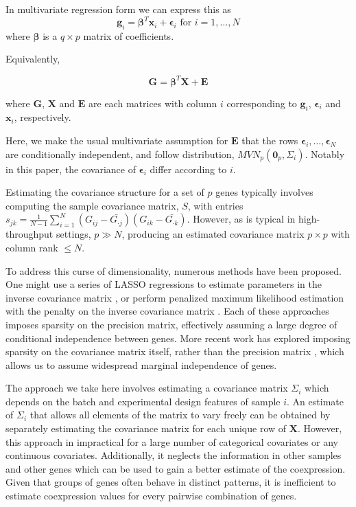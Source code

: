 In multivariate regression form we can express this as 
\[
\textbf{g}_{i}=\mathbf{\beta}^{T}\textbf{x}_{i}+\mathbf{\epsilon}_{i}\text{ for }i=1,\dots,N
\]
 where $\mathbf{\beta}$ is a $q\times p$ matrix of coefficients.

Equivalently,

\[
\textbf{G}=\mathbf{\beta}^T\textbf{X}+\mathbf{E}
\]

where $\textbf{G}$, $\textbf{X}$ and $\textbf{E}$ are each matrices
with column $i$ corresponding to $\textbf{g}_{i}$, $\mathbf{\epsilon}_{i}$ and $\mathbf{x}_{i}$, respectively.

Here, we make the usual multivariate assumption for $\textbf{E}$
that the rows $\mathbf{\epsilon}_{i},\dots,\mathbf{\epsilon}_{N}$
are conditionally independent, and follow distribution, $MVN_{p}(\mathbf{0}_{p},\Sigma_{i})$.
Notably in this paper, the covariance of $\mathbf{\epsilon}_{i}$
differ according to $i$.

Estimating the covariance structure for a set of $p$ genes typically
involves computing the sample covariance matrix, $S$, with entries
$s_{jk}=\frac{1}{N-1}\sum_{i=1}^{N}(G_{ij}-\bar{G_{\cdot j}})(G_{ik}-\bar{G_{\cdot k}})$.
However, as is typical in high-throughput settings, $p\gg N$, producing
an estimated covariance matrix $p\times p$ with column rank $\le N$.

To address this \textquotedbl{}curse of dimensionality\textquotedbl{},
numerous methods have been proposed. One might use a series of LASSO
regressions to estimate parameters in the inverse covariance matrix
\cite{meinshausen2006high}, or perform penalized maximum likelihood
estimation with the penalty on the inverse covariance matrix \cite{banerjee2008model,yuan2007model,friedman2008sparse}.
Each of these approaches imposes sparsity on the precision matrix,
effectively assuming a large degree of conditional independence between
genes. More recent work has explored imposing sparsity on the covariance
matrix itself, rather than the precision matrix \cite{bien2011sparse},
which allows us to assume widespread marginal independence of genes. 

The approach we take here involves estimating a covariance matrix
$\Sigma_{i}$ which depends on the batch and experimental design features
of sample $i$. An estimate of $\Sigma_{i}$ that allows all elements
of the matrix to vary freely can be obtained by separately estimating
the covariance matrix for each unique row of $\mathbf{X}$. However,
this approach in impractical for a large number of categorical covariates
or any continuous covariates. Additionally, it neglects the information
in other samples and other genes which can be used to gain a better
estimate of the coexpression. Given that groups of genes often behave
in distinct patterns, it is inefficient to estimate coexpression values
for every pairwise combination of genes.

